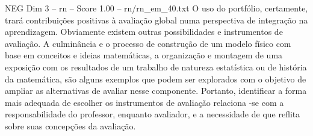 \begin{textsample}{NEG Dim 3 – rn – Score 1.00 – rn/rn\_em\_40.txt}
O uso do portfólio, certamente, trará contribuições positivas à avaliação global numa perspectiva de integração na aprendizagem.
Obviamente existem outras possibilidades e instrumentos de avaliação.
A culminância e o processo de construção de um modelo físico com base em conceitos e ideias matemáticas, a organização e montagem de uma exposição com os resultados de um trabalho de natureza estatística ou de história da matemática, são alguns exemplos que podem ser explorados com o objetivo de ampliar as alternativas de avaliar nesse componente.
Portanto, identificar a forma mais adequada de escolher os instrumentos de avaliação relaciona -se com a responsabilidade do professor, enquanto avaliador, e a necessidade de que reflita sobre suas concepções da avaliação.

\end{textsample}
